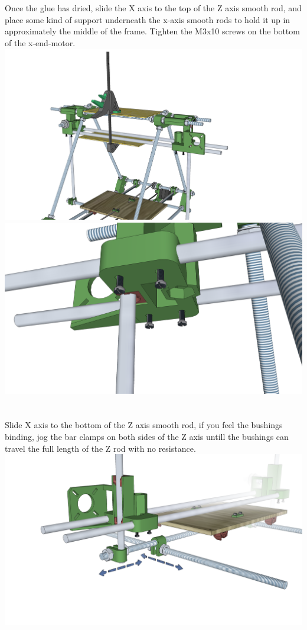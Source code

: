 \documentclass[twoside,a4paper,titlepage]{memoir}
\begin{document}
	\section{}
	Once the glue has dried, slide the X axis to the top of the Z axis smooth rod, and place some kind of support 		underneath the x-axis smooth rods to hold it up in approximately the middle of the frame.
	Tighten the M3x10 screws on the bottom of the x-end-motor.\\
	\includegraphics[width=1\linewidth]{graphics/ch8_14_1.png}
	\includegraphics[width=1\linewidth]{graphics/ch8_14_2.png}
	
	\section{}
	Slide X axis to the bottom of the Z axis smooth rod, if you feel the
	bushings binding, jog the bar clamps on both sides of the Z axis untill
	the bushings can travel the full length of the Z rod with no resistance.\\
	\includegraphics[width=1\linewidth]{graphics/ch8_15.png}
	
\end{document}
